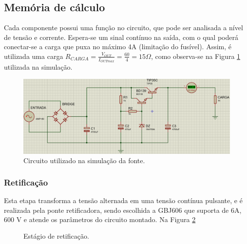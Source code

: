 \documentclass[a4paper,12pt,oneside,openany,table,xcdraw]{article}
\begin{document}
\vspace{0.5cm}
\subsection{Memória de cálculo} %
Cada componente possui uma função no circuito, que pode ser analisada a nível de tensão e corrente. Espera-se um sinal contínuo na saída, com o qual poderá conectar-se a carga que puxa no máximo 4A (limitação do fusível). Assim, é utilizada uma carga $R_{CARGA}=\frac{V_{OUT}}{I_{OUTmax}}=\frac{60}{4}=15\Omega$, como observa-se na Figura \ref{fonte:simulacao:circuito} utilizada na simulação.

\begin{figure}[H]
\centering
\captionsetup{font=scriptsize}
\includegraphics[width=15cm]{fonte-simulacao-circuito}
\caption{Circuito utilizado na simulação da fonte.}
\label{fonte:simulacao:circuito}
\end{figure}


\subsubsection{Retificação}
Esta etapa transforma a tensão alternada em uma tensão contínua pulsante, e é realizada pela ponte retificadora, sendo escolhida a GBJ606 que suporta de 6A, 600 V e atende os parâmetros do circuito montado. Na Figura \ref{fonte:retificacao}

\begin{figure}[H]
\centering
{}\hfill
{}
\caption{Estágio de retificação.}
\label{fonte:retificacao}
\end{figure}
\end{document}
